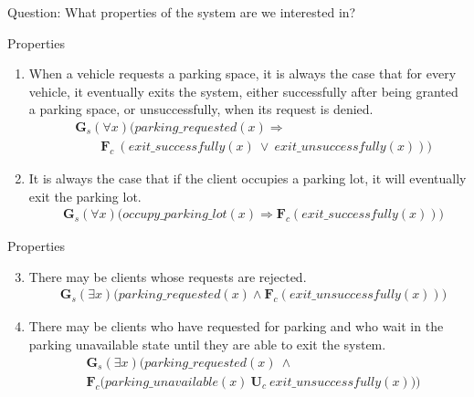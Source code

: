 \documentclass [serif,professionalfont]{beamer}
\begin{document}
\begin{frame}{}
    \centering
    \huge{Question: What properties of the system are we interested in?}
\end{frame}



\begin{frame}{Properties}
    \begin{enumerate}

        \item When a vehicle requests a parking space, it is always the case that for every vehicle, it eventually exits the system, either successfully after being granted a parking space, or unsuccessfully, when its request is denied.
              \pause
              \begin{align*}
                   & \mathbf{G}_s(\forall x) \Big( parking\_requested(x) \Rightarrow                \\
                   & \qquad\mathbf{F}_c~ (exit\_successfully(x)~\lor~exit\_unsuccessfully(x)) \Big)
              \end{align*}
              \pause
        \item It is always the case that if the client occupies a parking lot, it will eventually exit the parking lot. \pause
              \begin{align*}
                   & \mathbf{G}_s(\forall x) \Big(occupy\_parking\_lot(x)\Rightarrow \mathbf{F}_c(exit\_successfully(x))\Big)
              \end{align*}
    \end{enumerate}
\end{frame}


\begin{frame}{Properties}
    \begin{enumerate}
        \setcounter{enumi}{2}
        \item There may be clients whose requests are rejected.\pause
              \begin{align*}
                   & \mathbf{G}_s(\exists x) \big(parking\_requested(x) \land \mathbf{F}_c (exit\_unsuccessfully(x))\big)
              \end{align*}
              \pause
        \item There may be clients who have requested for parking and who wait in the parking unavailable state until they are able to exit the system.\pause
              \begin{align*}
                   & \mathbf{G}_s(\exists x) \bigg( parking\_requested(x)~\land                                 \\
                   & \mathbf{F}_c \big( parking\_unavailable(x)~\mathbf{U}_c~exit\_unsuccessfully(x)\big)\bigg)
              \end{align*}
    \end{enumerate}
\end{frame}
\end{document}
